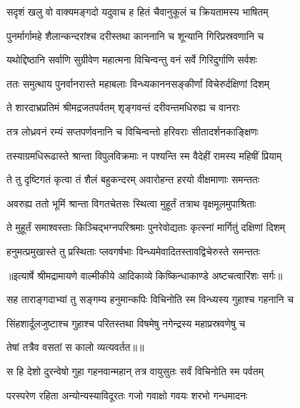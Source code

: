 \twolineshloka
{सदृशं खलु वो वाक्यमङ्गदो यदुवाच ह}
{हितं चैवानुकूलं च क्रियतामस्य भाषितम्} %

\twolineshloka
{पुनर्मार्गामहे शैलान्कन्दरांश्च दरीस्तथा}
{काननानि च शून्यानि गिरिप्रस्रवणानि च} %

\twolineshloka
{यथोद्दिष्ठानि सर्वाणि सुग्रीवेण महात्मना}
{विचिन्वन्तु वनं सर्वे गिरिदुर्गाणि सर्वशः} %

\twolineshloka
{ततः समुत्थाय पुनर्वानरास्ते महाबलाः}
{विन्ध्यकाननसङ्कीर्णां विचेरुर्दक्षिणां दिशम्} %

\twolineshloka
{ते शारदाभ्रप्रतिमं श्रीमद्रजतपर्वतम्}
{शृङ्गवन्तं दरीवन्तमधिरुह्य च वानराः} %

\twolineshloka
{तत्र लोध्रवनं रम्यं सप्तपर्णवनानि च}
{विचिन्वन्तो हरिवराः सीतादर्शनकाङ्क्षिणः} %

\twolineshloka
{तस्याग्रमधिरूढास्ते श्रान्ता विपुलविक्रमाः}
{न पश्यन्ति स्म वैदेहीं रामस्य महिषीं प्रियाम्} %

\twolineshloka
{ते तु दृष्टिगतं कृत्वा तं शैलं बहुकन्दरम्}
{अवारोहन्त हरयो वीक्षमाणाः समन्ततः} %

\twolineshloka
{अवरुह्य ततो भूमिं श्रान्ता विगतचेतसः}
{स्थित्वा मुहूर्तं तत्राथ वृक्षमूलमुपाश्रिताः} %

\twolineshloka
{ते मुहूर्तं समाश्वस्ताः किञ्चिद्भग्नपरिश्रमाः}
{पुनरेवोद्यताः कृत्स्नां मार्गितुं दक्षिणां दिशम्} %

\twolineshloka
{हनुमत्प्रमुखास्ते तु प्रस्थिताः प्लवगर्षभाः}
{विन्ध्यमेवादितस्तावद्विचेरुस्ते समन्ततः} %


{॥इत्यार्षे श्रीमद्रामायणे वाल्मीकीये आदिकाव्ये किष्किन्धाकाण्डे अष्टचत्वारिंशः सर्गः॥}


\twolineshloka
{सह ताराङ्गदाभ्यां तु सङ्गम्य हनुमान्कपिः}
{विचिनोति स्म विन्ध्यस्य गुहाश्च गहनानि च} %

\twolineshloka
{सिंहशार्दूलजुष्टाश्च गुहाश्च परितस्तथा}
{विषमेषु नगेन्द्रस्य महाप्रस्रवणेषु च} %

{तेषां तत्रैव वसतां स कालो व्यत्यवर्तत॥॥} %

\addtocounter{shlokacount}{1}

\twolineshloka
{स हि देशो दुरन्वेषो गुहा गहनवान्महान्}
{तत्र वायुसुतः सर्वं विचिनोति स्म पर्वतम्} %

\twolineshloka
{परस्परेण रहिता अन्योन्यस्याविदूरतः}
{गजो गवाक्षो गवयः शरभो गन्धमादनः} %

